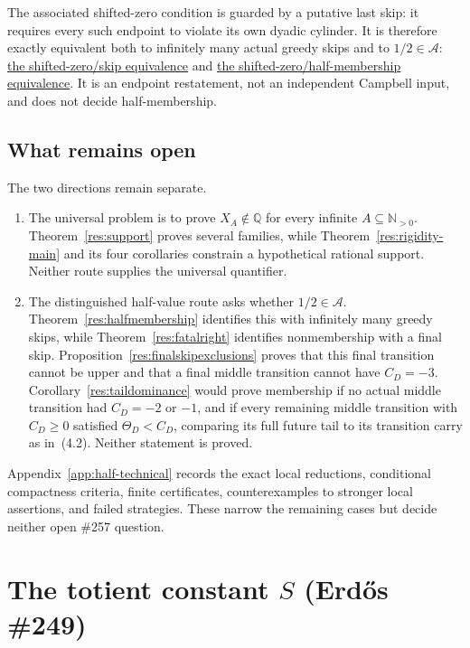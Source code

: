 \documentclass[11pt]{article}
\newcommand{\commit}{312b96c0d149ed466725c62d4ef24cfc91bca34e}
\newcommand{\repobase}{https://github.com/wcook04/plectis-lean-erdos249-257/blob/\commit}
\newcommand{\PK}{Erdos249257}
\newcommand{\lword}[4]{\href{\repobase/\PK/#1\#L#2}{#4}}
\theoremstyle{definition}
\theoremstyle{remark}
\newcommand{\Npos}{\mathbb{N}_{>0}}
\newcommand{\Q}{\mathbb{Q}}
\begin{document}
{The associated shifted-zero condition is guarded by a putative last skip: it
requires every such endpoint to violate its own dyadic cylinder.  It is
therefore exactly equivalent both to infinitely many actual greedy skips and
to $1/2\in\mathcal A$:
\lword{CampbellShiftSynchronization.lean}{471}{shiftWindowZero_iff_greedyMersenneSkippedSupport_infinite}{the shifted-zero/skip equivalence}
and
\lword{CampbellShiftSynchronization.lean}{488}{shiftWindowZero_iff_half_mem_mersenneAchievementSet}{the shifted-zero/half-membership equivalence}.
It is an endpoint restatement, not an independent Campbell input, and does
not decide half-membership.

}

\subsection{What remains open}

The two directions remain separate.
\begin{enumerate}[label=\textup{(\alph*)},leftmargin=2.2em]
\item The universal problem is to prove \(X_A\notin\Q\) for every infinite
\(A\subseteq\Npos\).  Theorem~\ref{res:support} proves several
families, while Theorem~\ref{res:rigidity-main} and its four corollaries
constrain a hypothetical rational support.  Neither route supplies the
universal quantifier.
\item The distinguished half-value route asks whether \(1/2\in\mathcal A\).
Theorem~\ref{res:halfmembership} identifies this with infinitely many greedy
skips, while Theorem~\ref{res:fatalright} identifies nonmembership with a
final skip.  Proposition~\ref{res:finalskipexclusions} proves that this final
transition cannot be upper and that a final middle transition cannot have
\(C_D=-3\).  Corollary~\ref{res:taildominance} would prove membership if no
actual middle transition had \(C_D=-2\) or \(-1\), and if every remaining
middle transition with \(C_D\geq0\) satisfied
\(\Theta_D<C_D\), comparing its full future tail to its transition carry
as in~\textup{(4.2)}.  Neither statement is proved.
\end{enumerate}
Appendix~\ref{app:half-technical} records the exact local reductions,
conditional compactness criteria, finite certificates, counterexamples to
stronger local assertions, and failed strategies.  These narrow the remaining
cases but decide neither open \#257 question.

\section{The totient constant $S$ (Erd\H{o}s \#249)}\label{sec:249}
\end{document}
